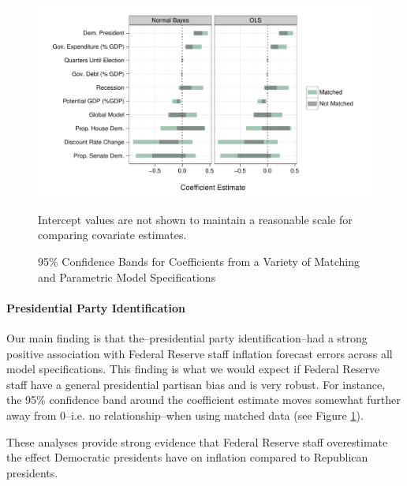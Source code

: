\documentclass[a4paper]{article}\usepackage{graphicx, color}
\newenvironment{knitrout}{}{} %
\begin{document}
\begin{figure}[t]
    \caption{95\% Confidence Bands for Coefficients from a Variety of Matching and Parametric Model Specifications}
    \label{CoefComparePlots}
    \begin{center}

\begin{knitrout}
\color{fgcolor}\includegraphics[width=0.95\linewidth]{figure/CoefComparePlots} 
\end{knitrout}

    \end{center}
    \begin{singlespace}
        {\scriptsize{Intercept values are not shown to maintain a reasonable scale for comparing covariate estimates.}}
    \end{singlespace}
\end{figure}

\paragraph{Presidential Party Identification}

Our main finding is that the--presidential party identification--had a strong positive association with Federal Reserve staff inflation forecast errors across all model specifications. This finding is what we would expect if Federal Reserve staff have a general presidential partisan bias and is very robust. For instance, the 95\% confidence band around the coefficient estimate moves somewhat further away from 0--i.e. no relationship--when using matched data (see Figure \ref{CoefComparePlots}).  

These analyses provide strong evidence that Federal Reserve staff overestimate the effect Democratic presidents have on inflation compared to Republican presidents.
\end{document}
